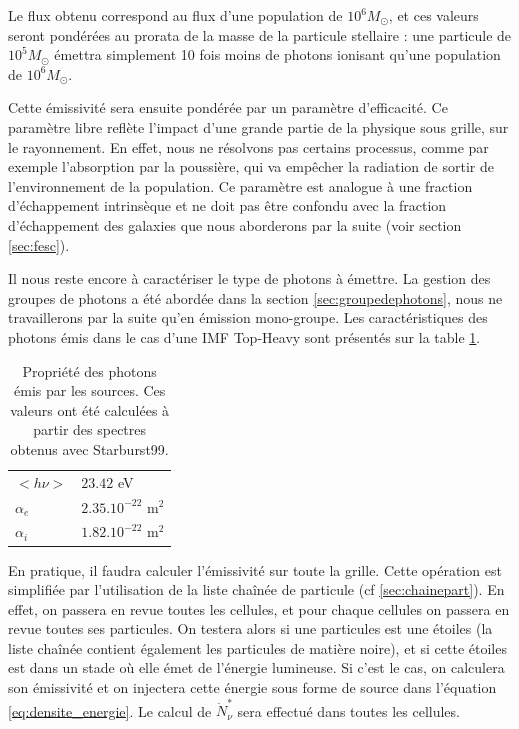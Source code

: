 Le flux obtenu correspond au flux d'une population de $10^6M_\odot$, et ces valeurs seront pondérées au prorata de la masse de la particule stellaire : une particule de $10^5M_\odot$ émettra  simplement 10 fois moins de photons ionisant qu'une population de $10^6 M_\odot$.

Cette émissivité sera ensuite pondérée par un paramètre d'efficacité.
Ce paramètre libre reflète l'impact d'une grande partie de la physique sous grille, sur le rayonnement.
En effet, nous ne résolvons pas certains processus, comme par exemple l'absorption par la poussière, qui va empêcher la radiation de sortir de l’environnement de la population.
Ce paramètre est analogue à une fraction d'échappement intrinsèque et ne doit pas être confondu avec la fraction d'échappement des galaxies que nous aborderons par la suite (voir section \ref{sec:fesc}).

Il nous reste encore à caractériser le type de photons à émettre.
La gestion des groupes de photons a été abordée dans la section \ref{sec:groupedephotons}, nous ne travaillerons par la suite qu'en émission mono-groupe.
Les caractéristiques des photons émis dans le cas d'une \ac{IMF} Top-Heavy sont présentés sur la table \ref{tab_photon}.

\begin{table}
\begin{tabular}{l l }
	$<h\nu>$	&  $23.42$ eV \\
	$\alpha_e$	&  $2.35.10^{-22}$ m$^2$ \\
	$\alpha_i$	&  $1.82.10^{-22}$ m$^2$ \\
\end{tabular}
\caption[Propriété des photons]{Propriété des photons émis par les sources.
Ces valeurs ont été calculées à partir des spectres obtenus avec Starburst99.
\label{tab_photon}}
\end{table}


En pratique, il faudra calculer l'émissivité sur toute la grille.
Cette opération est simplifiée par l'utilisation de la liste chaînée de particule (cf \ref{sec:chainepart}).
En effet, on passera en revue toutes les cellules, et pour chaque cellules on passera en revue toutes ses particules.
On testera alors si une particules est une étoiles (la liste chaînée contient également les particules de matière noire), et si cette étoiles est dans un stade où elle émet de l'énergie lumineuse.
Si c'est le cas, on calculera son émissivité et on injectera cette énergie sous forme de source dans l'équation \ref{eq:densite_energie}.
Le calcul de $\dot{N}_\nu^*$ sera effectué dans toutes les cellules.

